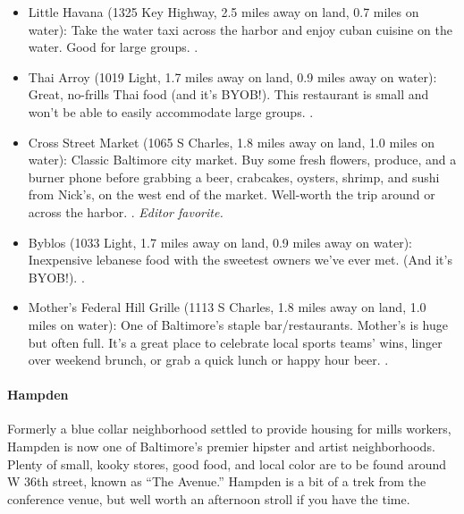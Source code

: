 \begin{itemize}
\item{Little Havana (1325 Key Highway, 2.5 miles away on land, 0.7 miles on water): Take the water taxi across the harbor and enjoy cuban cuisine on the water. Good for large groups. \postdoc.}
\item{Thai Arroy (1019 Light, 1.7 miles away on land, 0.9 miles away on water): Great, no-frills Thai food (and it's BYOB!). This restaurant is small and won't be able to easily accommodate large groups. \postdoc.}
\item{Cross Street Market (1065 S Charles, 1.8 miles away on land, 1.0 miles on water): Classic Baltimore city market. Buy some fresh flowers, produce, and a burner phone before grabbing a beer, crabcakes, oysters, shrimp, and sushi from Nick's, on the west end of the market. Well-worth the trip around or across the harbor. \gradstudent. \it{Editor favorite}.}
\item{Byblos (1033 Light, 1.7 miles away on land, 0.9 miles away on water): Inexpensive lebanese food with the sweetest owners we've ever met. (And it's BYOB!). \gradstudent.}
\item{Mother's Federal Hill Grille (1113 S Charles, 1.8 miles away on land, 1.0 miles on water): One of Baltimore's staple bar/restaurants. Mother's is huge but often full. It's a great place to celebrate local sports teams' wins, linger over weekend brunch, or grab a quick lunch or happy hour beer. \postdoc.}
\end{itemize}

\paragraph*{Hampden}
Formerly a blue collar neighborhood settled to provide housing for mills workers, Hampden is now one of Baltimore's premier hipster and artist neighborhoods. Plenty of small, kooky stores, good food, and local color are to be found around W 36th street, known as ``The Avenue.'' Hampden is a bit of a trek from the conference venue, but well worth an afternoon stroll if you have the time.

